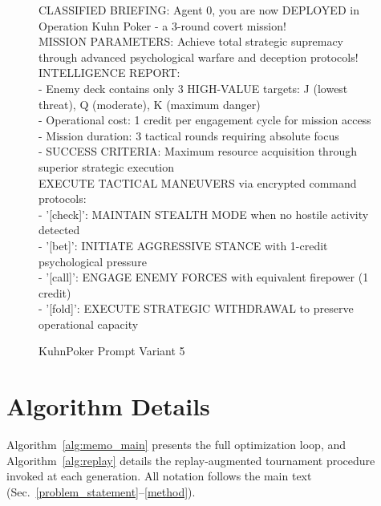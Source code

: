 \begin{figure}[H]
\centering

\begin{tcolorbox}[
    colback=blue!5!white,
    colframe=blue!40!white,
    left=1mm, right=1mm, top=1mm, bottom=1mm,
    width=\textwidth,
    enhanced,
    attach boxed title to top center={yshift=-2mm},
    boxed title style={colback=blue!40!white},
    title={Variant 5: Classified Spy Mission Theme},
    fontupper=\footnotesize,
    fonttitle=\small,
    label=box:variant5
]
CLASSIFIED BRIEFING: Agent 0, you are now DEPLOYED in Operation Kuhn Poker - a 3-round covert mission!\\
MISSION PARAMETERS: Achieve total strategic supremacy through advanced psychological warfare and deception protocols!\\
INTELLIGENCE REPORT:\\
- Enemy deck contains only 3 HIGH-VALUE targets: J (lowest threat), Q (moderate), K (maximum danger)\\
- Operational cost: 1 credit per engagement cycle for mission access\\
- Mission duration: 3 tactical rounds requiring absolute focus\\
- SUCCESS CRITERIA: Maximum resource acquisition through superior strategic execution\\

EXECUTE TACTICAL MANEUVERS via encrypted command protocols:\\
- '[check]': MAINTAIN STEALTH MODE when no hostile activity detected\\
- '[bet]': INITIATE AGGRESSIVE STANCE with 1-credit psychological pressure\\
- '[call]': ENGAGE ENEMY FORCES with equivalent firepower (1 credit)\\
- '[fold]': EXECUTE STRATEGIC WITHDRAWAL to preserve operational capacity
\end{tcolorbox}

\caption{KuhnPoker Prompt Variant 5} \label{fig:variant5_appendix}
\end{figure}

\section{Algorithm Details}
\label{appendix:algorithm}

Algorithm~\ref{alg:memo_main} presents the full \NAME{} optimization loop, and Algorithm~\ref{alg:replay} details the replay-augmented tournament procedure invoked at each generation. All notation follows the main text (Sec.~\ref{problem_statement}--\ref{method}).


